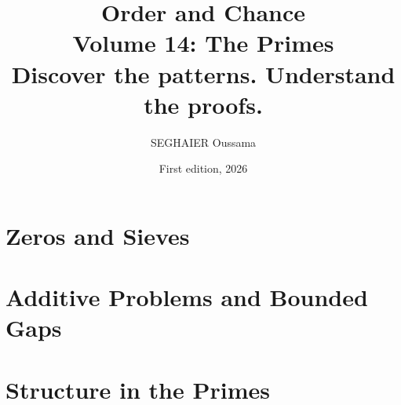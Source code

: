 \documentclass[11pt,openany]{book}
\title{\Huge\textbf{Order and Chance}\\[0.4em]\LARGE Volume 14: The Primes\\[0.6em]
\Large Discover the patterns. Understand the proofs.}
\author{SEGHAIER Oussama}
\date{First edition, 2026}
\begin{document}
\frontmatter
\makecover
\maketitle

\tableofcontents

\mainmatter

\part{Zeros and Sieves}





\part{Additive Problems and Bounded Gaps}




\part{Structure in the Primes}





\end{document}
